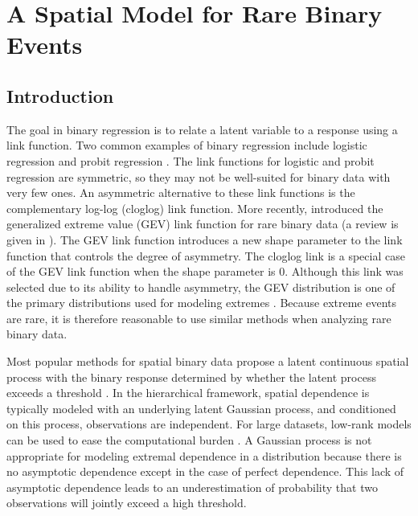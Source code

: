 \chapter{A Spatial Model for Rare Binary Events}
\label{chap:three}
\section{Introduction}\label{rbs:intro}

The goal in binary regression is to relate a latent variable to a response using a link function.
Two common examples of binary regression include logistic regression
and probit regression \citep{Agresti2003}.
The link functions for logistic and probit regression are symmetric, so they may not be well-suited for binary data with very few ones.
An asymmetric alternative to these link functions is the complementary log-log (cloglog) link function.
More recently, \citet{Wang2010} introduced the generalized extreme value (GEV) link function for rare binary data (a review is given in ).
The GEV link function introduces a new shape parameter to the link function that controls the degree of asymmetry.
The cloglog link is a special case of the GEV link function when the shape parameter is 0.
Although this link was selected due to its ability to handle asymmetry, the GEV distribution is one of the primary distributions used for modeling extremes \citep{Coles2001}.
Because extreme events are rare, it is therefore reasonable to use similar methods when analyzing rare binary data.

Most popular methods for spatial binary data propose a latent continuous spatial process with the binary response determined by whether the latent process exceeds a threshold \citep{DeOliveira2000,Diggle2007}.
In the hierarchical framework, spatial dependence is typically modeled with an underlying latent Gaussian process, and conditioned on this process, observations are independent.
For large datasets, low-rank models can be used to ease the computational burden \citep{Finley2015}.
A Gaussian process is not appropriate for modeling extremal dependence in a distribution because there is no asymptotic dependence except in the case of perfect dependence.
This lack of asymptotic dependence leads to an underestimation of probability that two observations will jointly exceed a high threshold.

